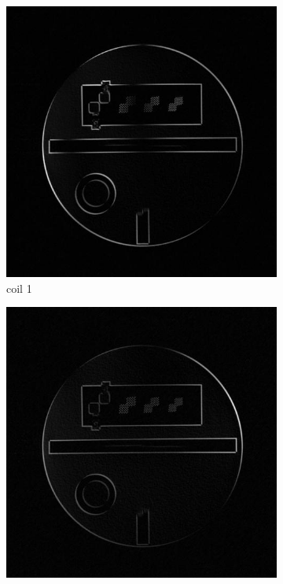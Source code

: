 \documentclass[UTF8]{article}
\begin{document}
\begin{figure}[ht]
	\begin{subfigure}[h]{0.2\textwidth}
		\centering
		\includegraphics[scale=0.15]{./image/2c.jpg}
		\caption{coil 1 }
		\label{fig:2b}
	\end{subfigure}
	\begin{subfigure}[h]{0.2\textwidth}
		\centering
		\includegraphics[scale=0.15]{./image/3c.jpg}

\end{subfigure}
\end{figure}
\end{document}
